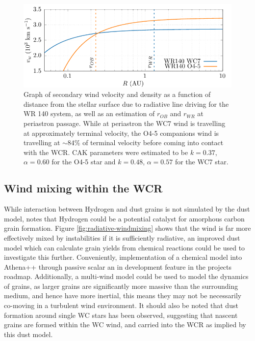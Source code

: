 \begin{figure}
  \centering
  \includegraphics{assets/stagnation-point/stag.pdf}
  \caption[Stagnation point wind velocity]{Graph of secondary wind velocity and density as a function of distance from the stellar surface due to radiative line driving for the WR 140 system, as well as an estimation of $r_{OB}$ and $r_{WR}$ at periastron passage. While at periastron the WC7 wind is travelling at approximately terminal velocity, the O4-5 companions wind is travelling at $\sim 84\%$ of terminal velocity before coming into contact with the WCR. CAK parameters were estimated to be $k = 0.37$, $\alpha = 0.60$ for the O4-5 star and $k=0.48$, $\alpha = 0.57$ for the WC7 star.}
  \label{fig:wr140-stagnation-obwind}
\end{figure}

\subsection{Wind mixing within the WCR}


While interaction between Hydrogen and dust grains is not simulated by the dust model, \textcite{leteuffModelDustFormation2002} notes that Hydrogen could be a potential catalyst for amorphous carbon grain formation.
Figure \ref{fig:radiative-windmixing} shows that the wind is far more effectively mixed by instabilities if it is sufficiently radiative, an improved dust model which can calculate grain yields from chemical reactions could be used to investigate this further.
Conveniently, implementation of a chemical model into Athena++ through passive scalar an in development feature in the projects roadmap.
Additionally, a multi-wind model could be used to model the dynamics of grains, as larger grains are significantly more massive than the surrounding medium, and hence have more inertial, this means they may not be necessarily co-moving in a turbulent wind environment.
It should also be noted that dust formation around single WC stars has been observed, suggesting that nascent grains are formed within the WC wind, and carried into the WCR as implied by this dust model.

